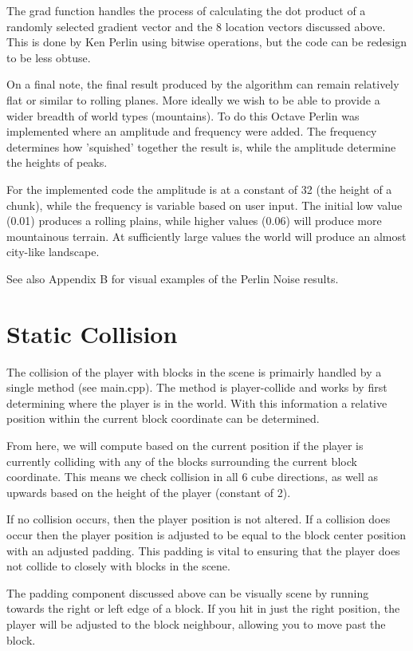 \documentclass{book}
\begin{document}
The grad function handles the process of calculating the dot product of a randomly selected gradient vector and the 8 location vectors discussed above.  This is done by Ken Perlin using bitwise operations, but the code can be redesign to be less obtuse.
    
On a final note, the final result produced by the algorithm can remain relatively flat or similar to rolling planes.  More ideally we wish to be able to provide a wider breadth of world types (mountains).  To do this Octave Perlin was implemented where an amplitude and frequency were added.  The frequency determines how 'squished' together the result is, while the amplitude determine the heights of peaks.
    
For the implemented code the amplitude is at a constant of 32 (the height of a chunk), while the frequency is variable based on user input.  The initial low value (0.01) produces a rolling plains, while higher values (0.06) will produce more mountainous terrain.  At sufficiently large values the world will produce an almost city-like landscape.
    
See also Appendix B for visual examples of the Perlin Noise results.
    
\section{Static Collision}
The collision of the player with blocks in the scene is primairly handled by a single method (see main.cpp).  The method is player-collide and works by first determining where the player is in the world.  With this information a relative position within the current block coordinate can be determined.  
    
From here, we will compute based on the current position if the player is currently colliding with any of the blocks surrounding the current block coordinate.  This means we check collision in all 6 cube directions, as well as upwards based on the height of the player (constant of 2).
    
If no collision occurs, then the player position is not altered.  If a collision does occur then the player position is adjusted to be equal to the block center position with an adjusted padding.  This padding is vital to ensuring that the player does not collide to closely with blocks in the scene.
    
The padding component discussed above can be visually scene by running towards the right or left edge of a block.  If you hit in just the right position, the player will be adjusted to the block neighbour, allowing you to move past the block.
   
\end{document}
